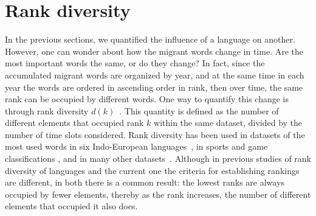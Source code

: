 \documentclass[10pt,letterpaper]{article} %
\begin{document}
\section*{Rank diversity} %

In the previous sections, we quantified the influence of a language on another. However, 
one can wonder about how the migrant words change in time. Are the most important words
the same, or do they change? In fact, 
since the accumulated migrant words are organized by year, and at the same time
in each year the words are ordered in ascending order in rank, then over time,
the same rank can be occupied by different words. One way to quantify
this change is through rank diversity $d(k)$~\cite{iplosone}. This quantity is
defined as the number 
of different elements that occupied rank  $k$ within the same dataset, divided
by the number of time slots considered.
Rank diversity has been used in datasets of the most used words in six
Indo-European languages~\cite{iplosone,10.3389/fphy.2018.00045,Cocho2019}, in sports and game classifications \cite{Morales_epj}, 
and in many other datasets~\cite{Iniguez2022}. 
Although in previous studies of rank diversity of languages and the current one the criteria for establishing rankings are different, in both there
is a common result: the lowest ranks are always occupied by fewer
elements, thereby as the rank increases, the number of different elements that occupied it
also does.
\end{document}

